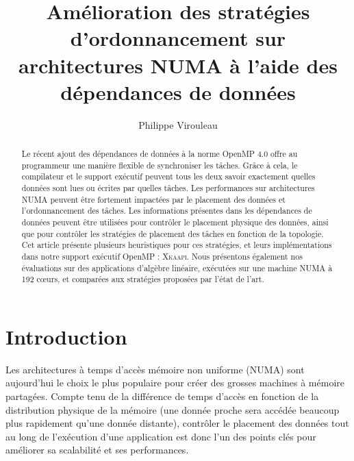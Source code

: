 \documentclass[parallelisme]{compas2016}
\begin{document}
\title{Amélioration des stratégies d'ordonnancement sur architectures NUMA à l'aide
des dépendances de données}

\author{Philippe Virouleau}
\address{Inria,\\
   Univ. Grenoble Alpes,  CNRS, Grenoble Institute of Technology, LIG, Grenoble, France\\
   philippe.virouleau@inria.fr\\
}
\date{}


\maketitle

\newcommand{\benchs}{KASTORS }
\newcommand{\kaapi}{\textsc{\mbox{Xkaapi}}\xspace}
\begin{abstract}
Le récent ajout des dépendances de données à la norme OpenMP 4.0 offre
au programmeur une manière flexible de synchroniser les tâches.
Grâce à cela, le compilateur et le support exécutif peuvent tous les deux savoir
exactement quelles données sont lues ou écrites par quelles tâches.
Les performances sur architectures NUMA peuvent être fortement impactées par
le placement des données et l'ordonnancement des tâches. Les informations présentes
dans les dépendances de données peuvent être utilisées pour contrôler le placement physique des données,
ainsi que pour contrôler les stratégies de placement des tâches en
fonction de la topologie.
Cet article présente plusieurs heuristiques pour ces stratégies, et leurs implémentations
dans notre support exécutif OpenMP : \kaapi.
Nous présentons également nos évaluations sur des applications d'algèbre linéaire,
exécutées sur une machine NUMA à 192 cœurs, et comparées aux stratégies proposées
par l'état de l'art.
\end{abstract}

	
\vspace*{-4ex}
\section{Introduction}

Les architectures à temps d'accès mémoire non uniforme (NUMA) sont
aujourd'hui le choix le plus populaire pour créer des grosses machines à mémoire
partagées.
Compte tenu de la différence de temps d'accès en fonction de la distribution physique
de la mémoire (une donnée proche sera accédée beaucoup plus rapidement qu'une donnée distante),
contrôler le placement des données tout au long de l'exécution d'une application
est donc l'un des points clés pour améliorer sa scalabilité et ses performances.
\end{document}
